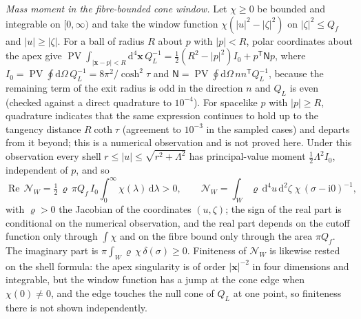 \emph{Mass moment in the fibre-bounded cone window.} Let \(\chi\ge0\) be bounded and integrable on \([0,\infty)\) and take the window function \(\chi(|u|^2-|\zeta|^2)\) on \(|\zeta|^2\le Q_f\) and \(|u|\ge|\zeta|\). For a ball of radius \(R\) about \(p\) with \(|p|<R\), polar coordinates about the apex give \(\operatorname{PV}\!\int_{|\boldsymbol x-p|<R}\mathrm d^4\boldsymbol x\,Q_L^{-1}=\tfrac12(R^2-|p|^2)I_0+p^{\mathsf T}\mathsf Np\), where \(I_0=\operatorname{PV}\oint\mathrm d\Omega\,Q_L^{-1}=8\pi^2/\cosh^2\tau\) and \(\mathsf N=\operatorname{PV}\oint\mathrm d\Omega\,nn^{\mathsf T}Q_L^{-1}\), because the remaining term of the exit radius is odd in the direction \(n\) and \(Q_L\) is even (checked against a direct quadrature to \(10^{-4}\)). For spacelike \(p\) with \(|p|\ge R\), quadrature indicates that the same expression continues to hold up to the tangency distance \(R\coth\tau\) (agreement to \(10^{-3}\) in the sampled cases) and departs from it beyond; this is a numerical observation and is not proved here. Under this observation every shell \(r\le|u|\le\sqrt{r^2+\Lambda^2}\) has principal-value moment \(\tfrac12\Lambda^2I_0\), independent of \(p\), and so
\[
  \operatorname{Re}\,\mathcal N_W=\tfrac12\,\varrho\,\pi Q_f\,I_0\int_0^\infty\chi(\lambda)\,\mathrm d\lambda>0 ,\qquad
  \mathcal N_W=\int_W\varrho\,\mathrm d^4u\,\mathrm d^2\zeta\;\chi\,(\sigma-\mathrm i0)^{-1},
\]
with \(\varrho>0\) the Jacobian of the coordinates \((u,\zeta)\); the sign of the real part is conditional on the numerical observation, and the real part depends on the cutoff function only through \(\int\chi\) and on the fibre bound only through the area \(\pi Q_f\). The imaginary part is \(\pi\int_W\varrho\,\chi\,\delta(\sigma)\ge0\). Finiteness of \(\mathcal N_W\) is likewise rested on the shell formula: the apex singularity is of order \(|\boldsymbol x|^{-2}\) in four dimensions and integrable, but the window function has a jump at the cone edge when \(\chi(0)\ne0\), and the edge touches the null cone of \(Q_L\) at one point, so finiteness there is not shown independently.

